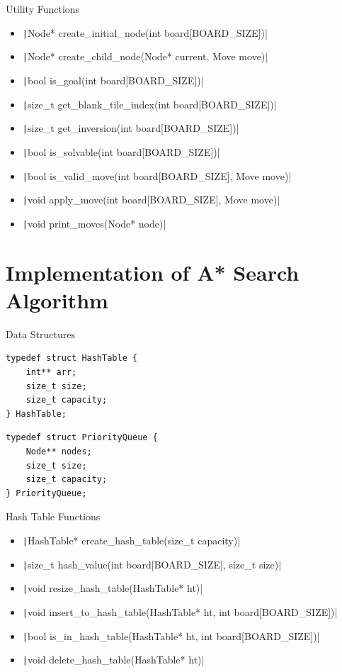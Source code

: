 \documentclass{oxblue-beamer}
\begin{document}
\begin{frame}{Utility Functions}
\begin{itemize}
    \item \texttt|Node* create_initial_node(int board[BOARD_SIZE])|
    \item \texttt|Node* create_child_node(Node* current, Move move)|
    \item \texttt|bool is_goal(int board[BOARD_SIZE])|
    \item \texttt|size_t get_blank_tile_index(int board[BOARD_SIZE])|
    \item \texttt|size_t get_inversion(int board[BOARD_SIZE])|
    \item \texttt|bool is_solvable(int board[BOARD_SIZE])|
    \item \texttt|bool is_valid_move(int board[BOARD_SIZE], Move move)|
    \item \texttt|void apply_move(int board[BOARD_SIZE], Move move)|
    \item \texttt|void print_moves(Node* node)|
\end{itemize}
\end{frame}

\section{Implementation of A* Search Algorithm}

\begin{frame}[fragile]{Data Structures}
\begin{multicols}{2}
\begin{verbatim}
typedef struct HashTable {
    int** arr;
    size_t size;
    size_t capacity;
} HashTable;
\end{verbatim}
\columnbreak
\begin{verbatim}
typedef struct PriorityQueue {
    Node** nodes;
    size_t size;
    size_t capacity;
} PriorityQueue;
\end{verbatim}
\end{multicols}
\end{frame}

\begin{frame}{Hash Table Functions}
\begin{itemize}
    \item \texttt|HashTable* create_hash_table(size_t capacity)|
    \item \texttt|size_t hash_value(int board[BOARD_SIZE], size_t size)|
    \item \texttt|void resize_hash_table(HashTable* ht)|
    \item \texttt|void insert_to_hash_table(HashTable* ht, int board[BOARD_SIZE])|
    \item \texttt|bool is_in_hash_table(HashTable* ht, int board[BOARD_SIZE])|
    \item \texttt|void delete_hash_table(HashTable* ht)|
\end{itemize}
\end{frame}
\end{document}
